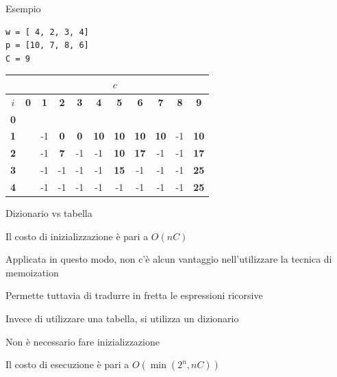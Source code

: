 \begin{frame}[fragile]{Esempio}

\vspace{-18pt}
\begin{lstlisting}
w = [ 4, 2, 3, 4]
p = [10, 7, 8, 6]
C = 9  
\end{lstlisting}

\bigskip
\begin{tabular}{|c|c|c|c|c|c|c|c|c|c|c|}
\hline
& \multicolumn{10}{c|}{$c$} \\\hline
$i$ & \textbf{0} & \textbf{1} & \textbf{2} & \textbf{3} & \textbf{4} & \textbf{5} & \textbf{6} & \textbf{7} & \textbf{8} & \textbf{9}  \\\hline
\bf{0} &   &    &    &    &    &    &    &    &    &    \\\hline
\bf{1} &   &  -1 &  \alert{\bf 0} &  \alert{\bf 0} & \alert{\bf 10} & \alert{\bf 10} & \alert{\bf 10} & \alert{\bf 10} & -1 & \alert{\bf 10} \\\hline
\bf{2} &   &  -1 &  \alert{\bf 7} & -1 & -1 & \alert{\bf 10} & \alert{\bf 17} & -1 & -1 & \alert{\bf 17} \\\hline
\bf{3} &   &  -1 &  -1 &  -1 & -1 & \alert{\bf 15} & -1 & -1 & -1 & \alert{\bf 25} \\\hline
\bf{4} &   &  -1 &  -1 &  -1 & -1 & -1 & -1 & -1 & -1 & \alert{\bf 25} \\\hline  
\end{tabular}  
  
\end{frame}

\begin{frame}{Dizionario vs tabella}

\vspace{-9pt}
  \BIL
  \item Il costo di inizializzazione è pari a $O(nC)$
  \item Applicata in questo modo, non c'è alcun vantaggio nell'utilizzare
  la tecnica di memoization
  \item Permette tuttavia di tradurre in fretta le espressioni ricorsive
  \EIL

\pause
{}
  \BIL
  \item Invece di utilizzare una tabella, si utilizza un dizionario
  \item Non è necessario fare inizializzazione
  \item Il costo di esecuzione è pari a $O(\min(2^n,nC))$
  \EIL

\end{frame}

